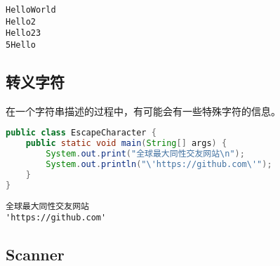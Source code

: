 \begin{tcolorbox}
	\begin{verbatim}
HelloWorld
Hello2
Hello23
5Hello
	\end{verbatim}
\end{tcolorbox}

\subsection{转义字符}

在一个字符串描述的过程中，有可能会有一些特殊字符的信息。

\begin{table}[H]
	\centering
	\caption{转义字符}
\end{table}


\begin{lstlisting}[language=Java]
public class EscapeCharacter {
	public static void main(String[] args) {
		System.out.print("全球最大同性交友网站\n");
		System.out.println("\'https://github.com\'");
	}
}
\end{lstlisting}

\begin{tcolorbox}
	\begin{verbatim}
全球最大同性交友网站
'https://github.com'
	\end{verbatim}
\end{tcolorbox}

\subsection{Scanner}

